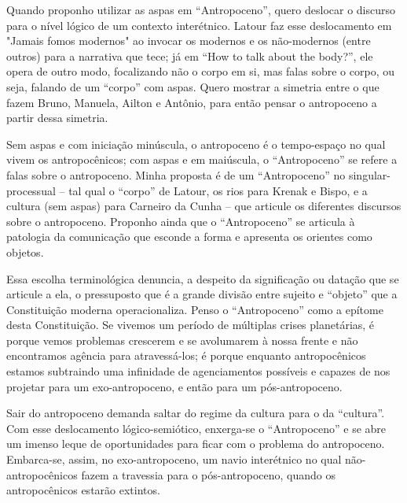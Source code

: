 Quando proponho utilizar as aspas em \enquote{Antropoceno}, quero deslocar o discurso para o nível lógico de um contexto interétnico. Latour faz esse deslocamento em "Jamais fomos modernos" ao invocar os modernos e os não-modernos (entre outros) para a narrativa que tece; já em \enquote{How to talk about the body?}, ele opera de outro modo, focalizando não o corpo em si, mas \guillemetleft falas sobre o corpo\guillemetright, ou seja, falando de um \enquote{corpo} com aspas. Quero mostrar a simetria entre o que fazem Bruno, Manuela, Ailton e Antônio, para então pensar o antropoceno a partir dessa simetria.

Sem aspas e com iniciação minúscula, o antropoceno é o tempo-espaço no qual vivem os antropocênicos; com aspas e em maiúscula, o \enquote{Antropoceno} se refere a \guillemetleft falas sobre o antropoceno\guillemetright. Minha proposta é de um \enquote{Antropoceno} no singular-processual -- tal qual o \enquote{corpo} de Latour, os rios para Krenak e Bispo, e a cultura (sem aspas) para Carneiro da Cunha -- que articule os diferentes discursos sobre o antropoceno. Proponho ainda que o \enquote{Antropoceno} se articula à patologia da comunicação que esconde a forma e apresenta os orientes como objetos.

Essa escolha terminológica denuncia, a despeito da significação ou datação que se articule a ela, o pressuposto que é a grande divisão entre sujeito e \enquote{objeto} que a Constituição moderna operacionaliza. Penso o \enquote{Antropoceno} como a epítome desta Constituição. Se vivemos um período de múltiplas crises planetárias, é porque vemos problemas crescerem e se avolumarem à nossa frente e não encontramos agência para atravessá-los; é porque enquanto antropocênicos estamos subtraindo uma infinidade de agenciamentos possíveis e capazes de nos projetar para um exo-antropoceno, e então para um pós-antropoceno.

Sair do antropoceno demanda saltar do regime da cultura para o da \enquote{cultura}. Com esse deslocamento lógico-semiótico, enxerga-se o \enquote{Antropoceno} e se abre um imenso leque de oportunidades para ficar com o problema do antropoceno. Embarca-se, assim, no exo-antropoceno, um navio interétnico no qual não-antropocênicos fazem a travessia para o pós-antropoceno, quando os antropocênicos estarão extintos.

